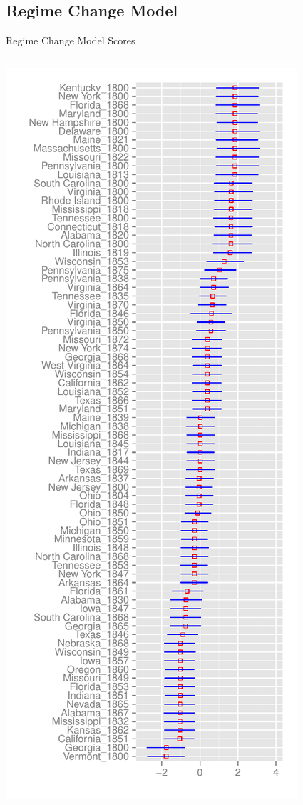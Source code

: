 \documentclass{beamer}              %
\makeatletter
\newcounter{acolumn}%
\let\column\@acolumn
\let\column\@@acolumn
\makeatother
\begin{document}
\subsection{Regime Change Model}
\begin{frame}{Regime Change Model Scores}
	\begin{columns}[c]
		\column{1.5in}
		\begin{center}
			\includegraphics[scale=.3]{graphics/regime/regime_param_mean_first_ggplot}

\end{center}
\end{columns}
\end{frame}
\end{document}
